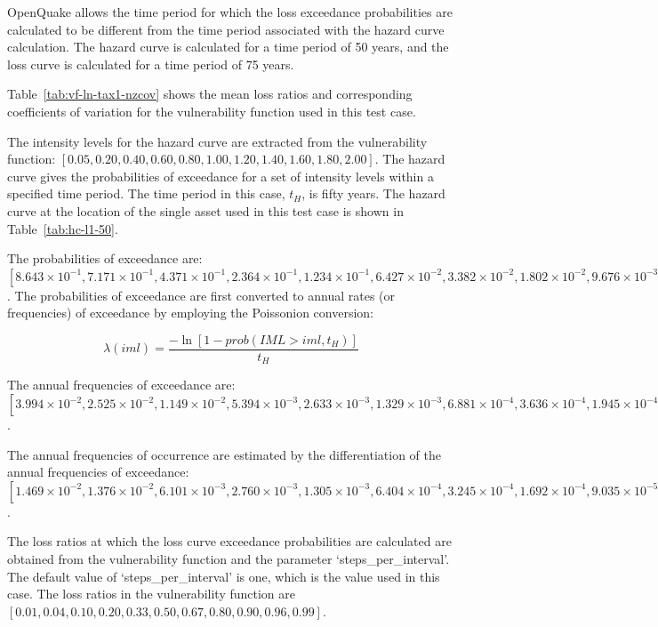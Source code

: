 OpenQuake allows the time period for which the loss exceedance probabilities are calculated to be different from the time period associated with the hazard curve calculation. The hazard curve is calculated for a time period of 50 years, and the loss curve is calculated for a time period of 75 years.

Table~\ref{tab:vf-ln-tax1-nzcov} shows the mean loss ratios and corresponding coefficients of variation for the vulnerability function used in this test case.



The intensity levels for the hazard curve are extracted from the vulnerability function: $[0.05, 0.20, 0.40, 0.60, 0.80, 1.00, 1.20, 1.40, 1.60, 1.80, 2.00]$. The hazard curve gives the probabilities of exceedance for a set of intensity levels within a specified time period. The time period in this case, $t_H$, is fifty years. The hazard curve at the location of the single asset used in this test case is shown in Table~\ref{tab:hc-l1-50}.

The probabilities of exceedance are: $[8.643\times10^{-1}, 7.171\times10^{-1}, 4.371\times10^{-1}, 2.364\times10^{-1}, 1.234\times10^{-1}, 6.427\times10^{-2}, 3.382\times10^{-2}, 1.802\times10^{-2}, 9.676\times10^{-3}, 5.192\times10^{-3}, 2.748\times10^{-3}]$. The probabilities of exceedance are first converted to annual rates (or frequencies) of exceedance by employing the Poissonion conversion:

\begin{equation}
	\lambda(iml) = \frac{-\ln [1 - prob(IML > iml, t_H)]}{t_H}
\end{equation}

The annual frequencies of exceedance are: $[3.994\times10^{-2}, 2.525\times10^{-2}, 1.149\times10^{-2}, 5.394\times10^{-3}, 2.633\times10^{-3}, 1.329\times10^{-3}, 6.881\times10^{-4}, 3.636\times10^{-4}, 1.945\times10^{-4}, 1.041\times10^{-4}, 5.504\times10^{-5}]$.

The annual frequencies of occurrence are estimated by the differentiation of the annual frequencies of exceedance: $[1.469\times10^{-2}, 1.376\times10^{-2}, 6.101\times10^{-3}, 2.760\times10^{-3}, 1.305\times10^{-3}, 6.404\times10^{-4}, 3.245\times10^{-4}, 1.692\times10^{-4}, 9.035\times10^{-5}, 4.907\times10^{-5}]$.

The loss ratios at which the loss curve exceedance probabilities are calculated are obtained from the vulnerability function and the parameter `steps\_per\_interval'. The default value of `steps\_per\_interval' is one, which is the value used in this case. The loss ratios in the vulnerability function are $[0.01, 0.04, 0.10, 0.20, 0.33, 0.50, 0.67, 0.80, 0.90, 0.96, 0.99]$.

